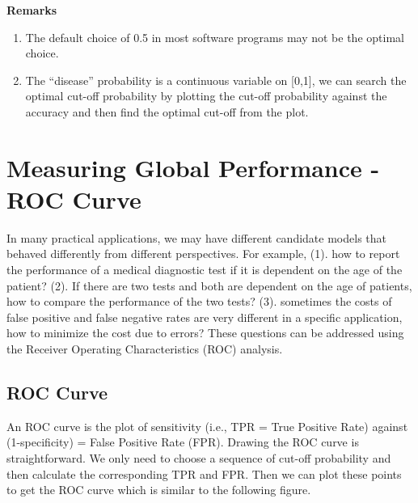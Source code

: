 \documentclass[
]{book}
\begin{document}
\textbf{Remarks}

\begin{enumerate}
\def\labelenumi{\arabic{enumi}.}
\item
  The default choice of 0.5 in most software programs may not be the optimal choice.
\item
  The ``disease'' probability is a continuous variable on {[}0,1{]}, we can search the optimal cut-off probability by plotting the cut-off probability against the accuracy and then find the optimal cut-off from the plot.
\end{enumerate}

\hypertarget{measuring-global-performance---roc-curve}{%
\section{Measuring Global Performance - ROC Curve}\label{measuring-global-performance---roc-curve}}

In many practical applications, we may have different candidate models that behaved differently from different perspectives. For example, (1). how to report the performance of a medical diagnostic test if it is dependent on the age of the patient? (2). If there are two tests and both are dependent on the age of patients, how to compare the performance of the two tests? (3). sometimes the costs of false positive and false negative rates are very different in a specific application, how to minimize the cost due to errors? These questions can be addressed using the Receiver Operating Characteristics (ROC) analysis.

\hypertarget{roc-curve}{%
\subsection{ROC Curve}\label{roc-curve}}

An ROC curve is the plot of sensitivity (i.e., TPR = True Positive Rate) against (1-specificity) = False Positive Rate (FPR). Drawing the ROC curve is straightforward. We only need to choose a sequence of cut-off probability and then calculate the corresponding TPR and FPR. Then we can plot these points to get the ROC curve which is similar to the following figure.
\end{document}
